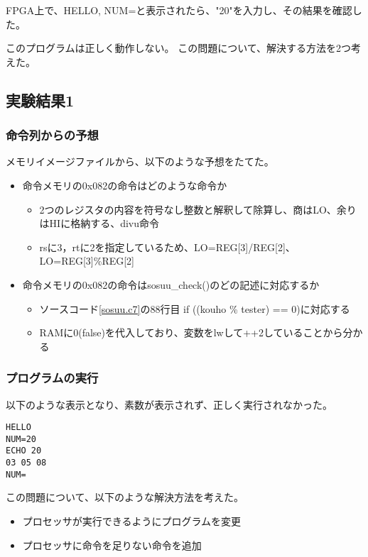 FPGA上で、HELLO, NUM=と表示されたら、"20"を入力し、その結果を確認した。

このプログラムは正しく動作しない。
この問題について、解決する方法を2つ考えた。

\subsection{実験結果1}
\subsubsection{命令列からの予想}
メモリイメージファイルから、以下のような予想をたてた。
\begin{itemize}
  \item 命令メモリの0x082の命令はどのような命令か
        \begin{itemize}
          \item 2つのレジスタの内容を符号なし整数と解釈して除算し、商はLO、余りはHIに格納する、divu命令
          \item rsに3，rtに2を指定しているため、LO=REG[3]/REG[2]、LO=REG[3]\%REG[2]
        \end{itemize}
  \item 命令メモリの0x082の命令はsosuu\_check()のどの記述に対応するか
        \begin{itemize}
          \item ソースコード\ref{sosuu.c7}の88行目 if ((kouho \% tester) == 0)に対応する
          \item RAMに0(false)を代入しており、変数をlwして++2していることから分かる
        \end{itemize}
\end{itemize}

\subsubsection{プログラムの実行}
以下のような表示となり、素数が表示されず、正しく実行されなかった。
\begin{lstlisting}[caption={sosuu.c実行結果1},label={sosuu.c実行結果17}]
HELLO
NUM=20
ECHO 20
03 05 08
NUM=
\end{lstlisting}

この問題について、以下のような解決方法を考えた。
\begin{itemize}
  \item プロセッサが実行できるようにプログラムを変更
  \item プロセッサに命令を足りない命令を追加
\end{itemize}

